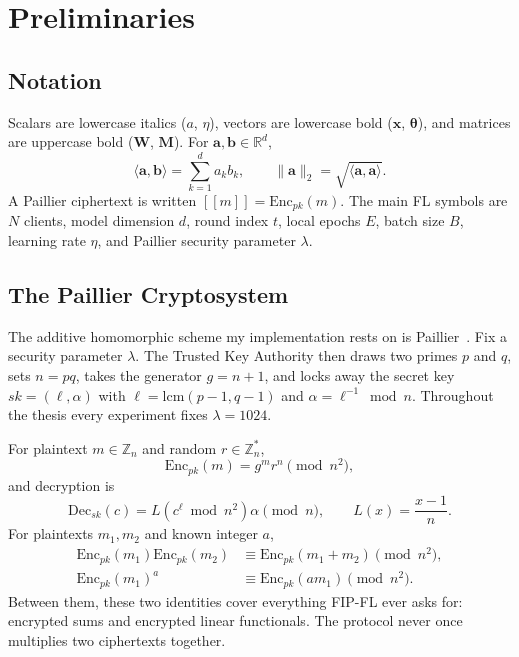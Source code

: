 \chapter{Preliminaries}
\label{Preliminaries:chap:chap4}
\graphicspath{{13.Chapter4/Images/}}

\section{Notation}
\label{sec:prelim-notation}

Scalars are lowercase italics ($a$, $\eta$), vectors are lowercase bold ($\mathbf{x}$, $\boldsymbol{\theta}$), and matrices are uppercase bold ($\mathbf{W}$, $\mathbf{M}$). For $\mathbf{a},\mathbf{b}\in\mathbb{R}^{d}$,
\begin{equation}
    \langle \mathbf{a},\mathbf{b}\rangle=\sum_{k=1}^{d}a_kb_k,\qquad
    \|\mathbf{a}\|_2=\sqrt{\langle \mathbf{a},\mathbf{a}\rangle}.
\end{equation}
A Paillier ciphertext is written $[\![m]\!]=\mathrm{Enc}_{pk}(m)$. The main FL symbols are $N$ clients, model dimension $d$, round index $t$, local epochs $E$, batch size $B$, learning rate $\eta$, and Paillier security parameter $\lambda$.

\section{The Paillier Cryptosystem}
\label{sec:prelim-paillier}

The additive homomorphic scheme my implementation rests on is Paillier~\cite{paillier1999public}. Fix a security parameter $\lambda$. The Trusted Key Authority then draws two primes $p$ and $q$, sets $n=pq$, takes the generator $g=n+1$, and locks away the secret key $sk=(\ell,\alpha)$ with $\ell=\mathrm{lcm}(p-1,q-1)$ and $\alpha=\ell^{-1}\bmod n$. Throughout the thesis every experiment fixes $\lambda=1024$.

For plaintext $m\in\mathbb{Z}_n$ and random $r\in\mathbb{Z}_n^*$,
\begin{equation}
    \mathrm{Enc}_{pk}(m)=g^mr^n \pmod{n^2},
    \label{eq:paillier-enc}
\end{equation}
and decryption is
\begin{equation}
    \mathrm{Dec}_{sk}(c)=L(c^\ell\bmod n^2)\alpha \pmod n,\qquad L(x)=\frac{x-1}{n}.
    \label{eq:paillier-dec}
\end{equation}
For plaintexts $m_1,m_2$ and known integer $a$,
\begin{align}
    \mathrm{Enc}_{pk}(m_1)\mathrm{Enc}_{pk}(m_2)
        &\equiv \mathrm{Enc}_{pk}(m_1+m_2) \pmod{n^2}, \label{eq:paillier-add}\\
    \mathrm{Enc}_{pk}(m_1)^a
        &\equiv \mathrm{Enc}_{pk}(a m_1) \pmod{n^2}. \label{eq:paillier-mul}
\end{align}
Between them, these two identities cover everything FIP-FL ever asks for: encrypted sums and encrypted linear functionals. The protocol never once multiplies two ciphertexts together.


